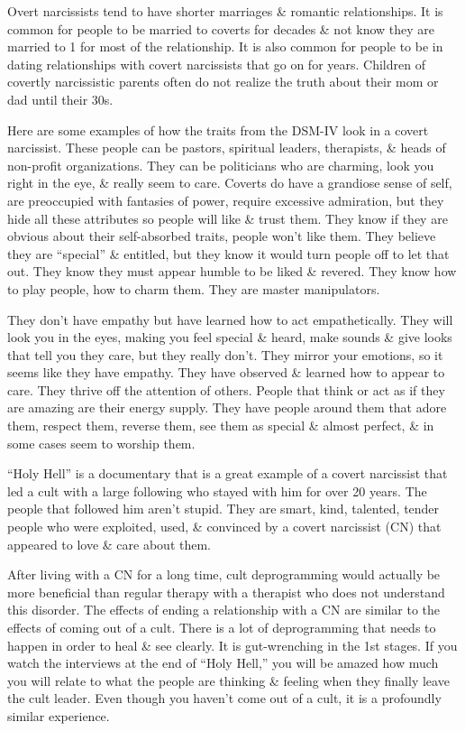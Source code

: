 \documentclass{article}
\numberwithin{equation}{section}
\begin{document}
Overt narcissists tend to have shorter marriages \& romantic relationships. It is common for people to be married to coverts for decades \& not know they are married to 1 for most of the relationship. It is also common for people to be in dating relationships with covert narcissists that go on for years. Children of covertly narcissistic parents often do not realize the truth about their mom or dad until their 30s.

Here are some examples of how the traits from the DSM-IV look in a covert narcissist. These people can be pastors, spiritual leaders, therapists, \& heads of non-profit organizations. They can be politicians who are charming, look you right in the eye, \& really seem to care. Coverts do have a grandiose sense of self, are preoccupied with fantasies of power, require excessive admiration, but they hide all these attributes so people will like \& trust them. They know if they are obvious about their self-absorbed traits, people won't like them. They believe they are ``special'' \& entitled, but they know it would turn people off to let that out. They know they must appear humble to be liked \& revered. They know how to play people, how to charm them. They are master manipulators.

They don't have empathy but have learned how to act empathetically. They will look you in the eyes, making you feel special \& heard, make sounds \& give looks that tell you they care, but they really don't. They mirror your emotions, so it seems like they have empathy. They have observed \& learned how to appear to care. They thrive off the attention of others. People that think or act as if they are amazing are their energy supply. They have people around them that adore them, respect them, reverse them, see them as special \& almost perfect, \& in some cases seem to worship them.

``Holy Hell'' is a documentary that is a great example of a covert narcissist that led a cult with a large following who stayed with him for over 20 years. The people that followed him aren't stupid. They are smart, kind, talented, tender people who were exploited, used, \& convinced by a covert narcissist (CN) that appeared to love \& care about them.

After living with a CN for a long time, cult deprogramming would actually be more beneficial than regular therapy with a therapist who does not understand this disorder. The effects of ending a relationship with a CN are similar to the effects of coming out of a cult. There is a lot of deprogramming that needs to happen in order to heal \& see clearly. It is gut-wrenching in the 1st stages. If you watch the interviews at the end of ``Holy Hell,'' you will be amazed how much you will relate to what the people are thinking \& feeling when they finally leave the cult leader. Even though you haven't come out of a cult, it is a profoundly similar experience.
\end{document}
